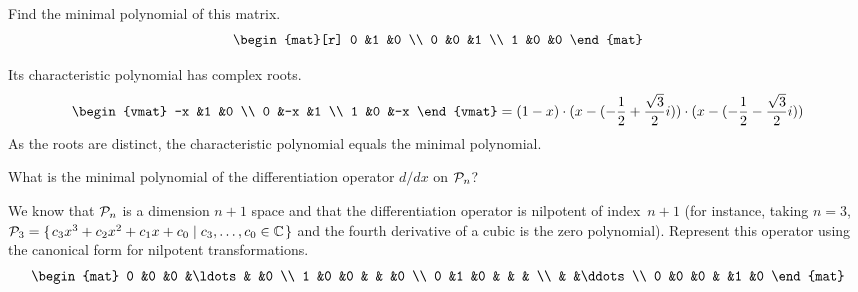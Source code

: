 \begin{exercises}
\begin{answer}
\begin{exparts}
      \end{exparts} 
    \end{answer}
   \item 
     Find the minimal polynomial of this matrix.
     \begin{equation*}
        \begin{mat}[r]
           0  &1  &0  \\
           0  &0  &1  \\
           1  &0  &0
        \end{mat}
     \end{equation*}
     \begin{answer}
       Its characteristic polynomial has complex roots.
       \begin{equation*}
          \begin{vmat}
                   -x  &1  &0  \\
                    0  &-x &1  \\
                    1  &0  &-x
          \end{vmat}
          =(1-x)\cdot (x-(-\frac{1}{2}+\frac{\sqrt{3}}{2}i))
                \cdot (x-(-\frac{1}{2}-\frac{\sqrt{3}}{2}i))
       \end{equation*}
       As the roots are distinct, the characteristic polynomial equals the
       minimal polynomial. 
     \end{answer}
  \recommended \item 
     What is the minimal polynomial of the differentiation
     operator $d/dx$ on \( \mathcal{P}_n \)?
     \begin{answer}
       We know that $\mathcal{P}_n$ is a dimension $n+1$ space and that
       the differentiation operator is
       nilpotent of index~$n+1$ (for instance, taking $n=3$, 
       $\mathcal{P}_3=\mbox{$\{\hspace{0.1em}c_3x^3+c_2x^2+c_1x+c_0\mid c_3,\ldots,c_0\in\mathbb{C}\hspace{0.1em}\}$}$
       and the fourth derivative of a cubic is the zero polynomial).  
       Represent this operator using the canonical 
       form for nilpotent transformations.
       \begin{equation*}
         \begin{mat}
           0  &0  &0  &\ldots &  &0  \\
           1  &0  &0  &       &  &0  \\
           0  &1  &0  &       &  &   \\
              &   &\ddots            \\
           0  &0  &0  &       &1 &0 
         \end{mat}

\end{equation*}
\end{answer}
\end{exercises}
